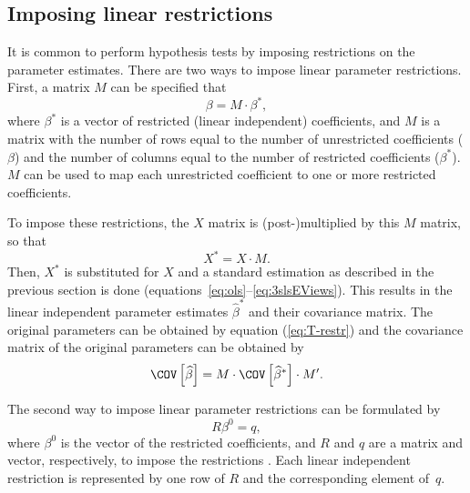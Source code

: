 \subsection{Imposing linear restrictions}\label{sec:Restrictions}

It is common to perform hypothesis tests by imposing restrictions on
the parameter estimates.
There are two ways to impose linear parameter restrictions.
First, a matrix $M$ can be specified that
\begin{equation}
   \beta = M \cdot \beta^* \label{eq:T-restr} ,
\end{equation}
where $\beta^*$ is a vector of restricted (linear independent) coefficients,
and $M$ is a matrix with the number of rows equal to the number of
unrestricted coefficients ($\beta$) and
the number of columns equal to the number of restricted coefficients
($\beta^*$).
$M$ can be used to map each unrestricted coefficient to one or more
restricted coefficients.

To impose these restrictions, the $X$ matrix is
(post-)\hspace{0pt}multiplied by this $M$ matrix, so that
\begin{equation}
    X^* = X \cdot M .
\end{equation}
Then, $X^*$ is substituted for $X$ and a standard estimation as described
in the previous section is done
(equations~\ref{eq:ols}--\ref{eq:3slsEViews}).
This results in the linear independent parameter estimates $\widehat{\beta}^*$ and
their covariance matrix.
The original parameters can be obtained by equation (\ref{eq:T-restr})
and the covariance matrix of the original parameters
can be obtained by
\begin{equation}
   \COV \left[ \widehat{\beta} \right]
   = M \cdot \COV \left[ \widehat{\beta}^* \right] \cdot M' .
\end{equation}

The second way to impose linear parameter restrictions
can be formulated by
\begin{equation}
   R \beta^0 = q ,
\end{equation}
where $\beta^0$ is the vector of the restricted coefficients, 
and $R$ and $q$ are a matrix and vector, respectively,
to impose the restrictions \citep[see][p.\ 100]{greene03}.
Each linear independent restriction is represented by one row of $R$
and the corresponding element of~$q$.

